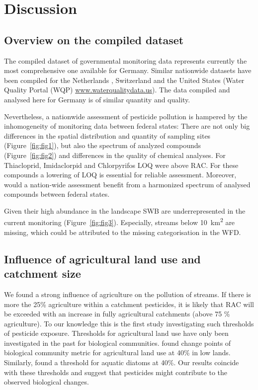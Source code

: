 \documentclass[journal=esthag,manuscript=article]{achemso}
\begin{document}
\section{Discussion}
\subsection{Overview on the compiled dataset}
The compiled dataset of governmental monitoring data represents currently the most comprehensive one available for Germany.
Similar nationwide datasets have been compiled for the Netherlands \citep{vijver_spatial_2008}, Switzerland \citep{munz_pestizidmessungen_2011} and the United States (Water Quality Portal (WQP) \url{www.waterqualitydata.us}).
The data compiled and analysed here for Germany is of similar quantity and quality.

Nevertheless, a nationwide assessment of pesticide pollution is hampered by the inhomogeneity of monitoring data between federal states:
There are not only big differences in the spatial distribution and quantity of sampling sites (Figure~\ref{fig:fig1}), but also the spectrum of analyzed compounds (Figure~\ref{fig:fig2}) and differences in the quality of chemical analyses. 
For Thiacloprid, Imidaclorpid and Chlorpyrifos LOQ were above RAC.
For these compounds a lowering of LOQ is essential for reliable assessment.
Moreover, would a nation-wide assessment benefit from a harmonized spectrum of analysed compounds between federal states.

Given their high abundance in the landscape \citep{nadeau_hydrological_2007} SWB are underrepresented in the current monitoring (Figure~\ref{fig:fig3}). 
Especially, streams below 10~km\textsuperscript{2} are missing, which could be attributed to the missing categorisation in the WFD. 



\subsection{Influence of agricultural land use and catchment size}
We found a strong influence of agriculture on the pollution of streams.
If there is more the 25\% agriculture within a catchment pesticides, it is likely that RAC will be exceeded with an increase in fully agricultural catchments (above 75 \% agriculture).
To our knowledge this is the first study investigating such thresholds of pesticide exposure.
Thresholds for agricultural land use have only been investigated in the past for biological communities.
\citet{feld_response_2013} found change points of biological community metric for agricultural land use at 40\% in low lands. 
Similarly, \citet{waite_agricultural_2014} found a threshold for aquatic diatoms at 40\%.
Our results coincide with these thresholds and suggest that pesticides might contribute to the observed biological changes. 
\end{document}
